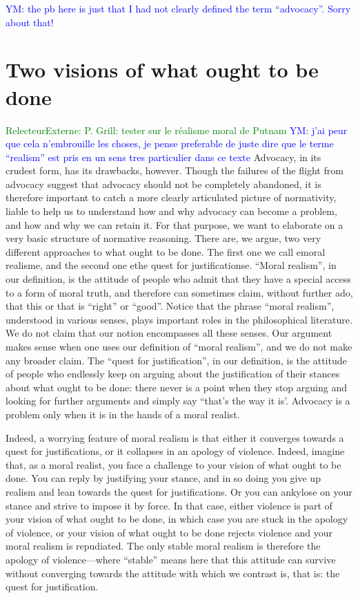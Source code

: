 \documentclass[preprint,11pt]{elsarticle}
\newcommand{\commentYM}[1]{\textcolor{blue}{YM: #1}}
\newcommand{\commentE}[1]{\textcolor{green}{RelecteurExterne: #1}}
\begin{document}
\commentYM{the pb here is just that I had not clearly defined the term ``advocacy''. Sorry about that!}



\section{Two visions of what ought to be done}
\commentE{P. Grill: tester sur le réalisme moral de Putnam}
\commentYM{j'ai peur que cela n'embrouille les choses, je pense preferable de juste dire que le terme ``realism'' est pris en un sens tres particulier dans ce texte}
\noindent Advocacy, in its crudest form, has its drawbacks, however. Though the failures of the flight from advocacy suggest that advocacy should not be completely abandoned, it is therefore important to catch a more clearly articulated picture of normativity, liable to help us to understand how and why advocacy can become a problem, and how and why we can retain it. For that purpose, we want to elaborate on a very basic structure of normative reasoning. There are, we argue, two very different approaches to what ought to be done. The first one we call emoral realisme, and the second one ethe quest for justificationse.
``Moral realism'', in our definition, is the attitude of people who admit that they have a special access to a form of moral truth, and therefore can sometimes claim, without further ado, that this or that is ``right'' or ``good''. Notice that the phrase ``moral realism'', understood in various senses, plays important roles in the philosophical literature. We do not claim that our notion encompasses all these senses. Our argument makes sense when one uses our definition of ``moral realism'', and we do not make any broader claim. The ``quest for justification'', in our definition, is the attitude of people who endlessly keep on arguing about the justification of their stances about what ought to be done: there never is a point when they stop arguing and looking for further arguments and simply say ``that's the way it is'. Advocacy is a problem only when it is in the hands of a moral realist.

Indeed, a worrying feature of moral realism is that either it converges towards a quest for justifications, or it collapses in an apology of violence. Indeed, imagine that, as a moral realist, you face a challenge to your vision of what ought to be done. You can reply by justifying your stance, and in so doing you give up realism and lean towards the quest for justifications. Or you can ankylose on your stance and strive to impose it by force. In that case, either violence is part of your vision of what ought to be done, in which case you are stuck in the apology of violence, or your vision of what ought to be done rejects violence and your moral realism is repudiated. The only stable moral realism is therefore the apology of violence—where ``stable'' means here that this attitude can survive without converging towards the attitude with which we contrast is, that is: the quest for justification.
\end{document}
